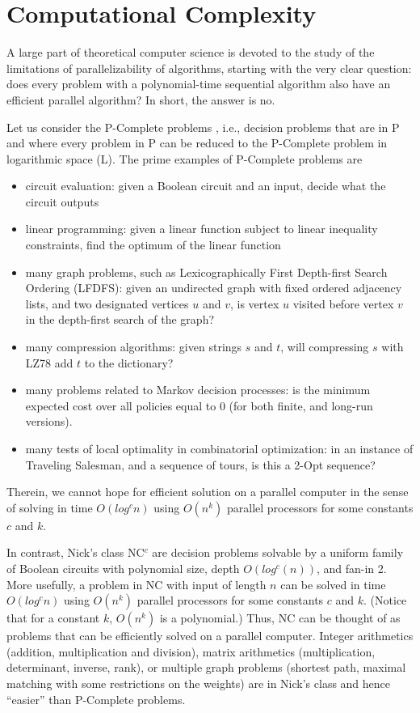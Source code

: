 \section{Computational Complexity}

A large part of theoretical computer science is devoted to the study of the limitations of parallelizability of algorithms, starting with the very clear question: does every problem 
with a polynomial-time sequential algorithm also have an efficient parallel algorithm? In short, the answer is no. 

Let us consider the P-Complete problems \cite{greenlaw1995limits}, i.e.,  decision problems that are in P and where every problem in P can be reduced to the P-Complete problem in logarithmic space (L). The prime examples of  P-Complete problems are 
\begin{itemize} 
\item circuit evaluation: given a Boolean circuit and an input, decide what the circuit outputs
\item linear programming: given a linear function subject to linear inequality constraints, find the optimum of the linear function
\item many graph problems, such as Lexicographically First Depth-first Search Ordering (LFDFS):
given an undirected graph with fixed ordered adjacency lists, and two designated vertices $u$ and $v$, is vertex $u$ visited before vertex $v$ in the depth-first search of the graph?
\item many compression algorithms: given strings $s$ and $t$, will compressing $s$ with LZ78 add $t$ to the dictionary?
\item many problems related to Markov decision processes: is the minimum expected cost over all policies equal to 0 (for both finite, and long-run versions). 
\item many tests of local optimality in combinatorial optimization: in an instance of Traveling Salesman, and a sequence of tours, is this a 2-Opt sequence? 
\end{itemize} 
Therein, we cannot hope for efficient solution on a parallel computer in the sense of solving in time $O(log^c n)$ using $O(n^k)$ parallel processors for some constants $c$ and $k$. 

\label{sec:Nicks}
In contrast, Nick's class NC$^{c}$ are decision problems solvable by a uniform family of Boolean circuits with polynomial size, depth $O(log^c(n))$, and fan-in 2. More usefully, a problem in NC with input of length $n$ can be solved in time $O(log^c n)$ using $O(n^k)$ parallel processors for some  constants $c$ and $k$. (Notice that for a constant $k$, $O(n^k)$ is a polynomial.) Thus, NC can be thought of as problems that can be efficiently solved on a parallel computer. Integer arithmetics (addition, multiplication and division), matrix arithmetics (multiplication, determinant, inverse, rank), or multiple graph problems (shortest path, maximal matching with some restrictions on the weights) are in Nick's class and hence ``easier'' than P-Complete problems. 

